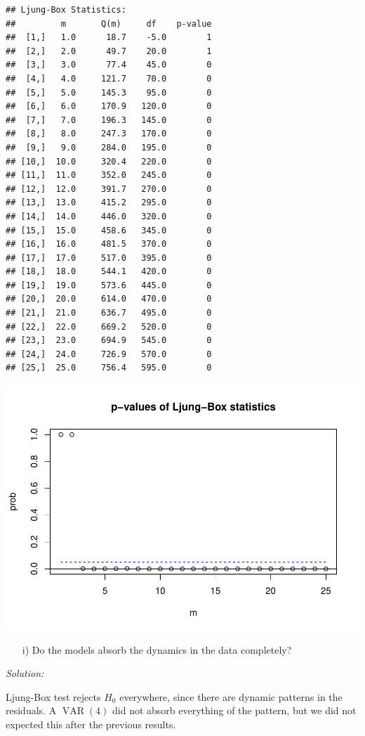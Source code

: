 \documentclass[12pt,a4paper]{article}
\newcommand{\VAR}{\operatorname{VAR}} %
\begin{document}
\begin{verbatim}
## Ljung-Box Statistics:  
##         m       Q(m)     df    p-value
##  [1,]   1.0      18.7    -5.0        1
##  [2,]   2.0      49.7    20.0        1
##  [3,]   3.0      77.4    45.0        0
##  [4,]   4.0     121.7    70.0        0
##  [5,]   5.0     145.3    95.0        0
##  [6,]   6.0     170.9   120.0        0
##  [7,]   7.0     196.3   145.0        0
##  [8,]   8.0     247.3   170.0        0
##  [9,]   9.0     284.0   195.0        0
## [10,]  10.0     320.4   220.0        0
## [11,]  11.0     352.0   245.0        0
## [12,]  12.0     391.7   270.0        0
## [13,]  13.0     415.2   295.0        0
## [14,]  14.0     446.0   320.0        0
## [15,]  15.0     458.6   345.0        0
## [16,]  16.0     481.5   370.0        0
## [17,]  17.0     517.0   395.0        0
## [18,]  18.0     544.1   420.0        0
## [19,]  19.0     573.6   445.0        0
## [20,]  20.0     614.0   470.0        0
## [21,]  21.0     636.7   495.0        0
## [22,]  22.0     669.2   520.0        0
## [23,]  23.0     694.9   545.0        0
## [24,]  24.0     726.9   570.0        0
## [25,]  25.0     756.4   595.0        0
\end{verbatim}

\includegraphics{solution_exercise_6_files/figure-latex/2_f-2.pdf}

\begin{itemize}
  \item[i)] Do the models absorb the dynamics in the data completely?
\end{itemize}

\emph{Solution:}

Ljung-Box test rejects \(H_0\) everywhere, since there are dynamic
patterns in the residuals. A \(\VAR(4)\) did not absorb everything of
the pattern, but we did not expected this after the previous results.
\end{document}
